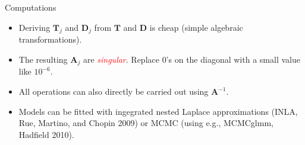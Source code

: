 \documentclass[10pt,ignorenonframetext,]{beamer}
\providecommand{\tightlist}{%
  \setlength{\itemsep}{0pt}\setlength{\parskip}{0pt}}
\begin{document}
\begin{frame}

\begin{block}{Computations}

\vspace{3mm}

\begin{itemize}
\tightlist
\item
  Deriving \(\mathbf{T}_j\) and \(\mathbf{D}_j\) from \(\mathbf{T}\) and
  \(\mathbf{D}\) is cheap (simple algebraic transformations).
\end{itemize}

\vspace{3mm}

\begin{itemize}
\tightlist
\item
  The resulting \(\mathbf{A}_j\) are \emph{\textcolor{red}{singular}}.
  Replace 0's on the diagonal with a small value like \(10^{-6}\).
\end{itemize}

\vspace{3mm}

\begin{itemize}
\tightlist
\item
  All operations can also directly be carried out using
  \(\mathbf{A}^{-1}\).
\end{itemize}

\vspace{3mm}

\begin{itemize}
\tightlist
\item
  Models can be fitted with ingegrated nested Laplace approximations
  (INLA, Rue, Martino, and Chopin 2009) or MCMC (using e.g., MCMCglmm,
  Hadfield 2010).
\end{itemize}

\end{block}

\end{frame}
\end{document}
